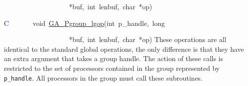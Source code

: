 ~~~~~~~~~~~~~~~~~~~{*}buf,~int~lenbuf,~char~{*}op)

\textcolor{blue}{C}~~~~~~~void~\href{https://hpc.pnl.gov/globalarrays/api/c_op_api.html\#GA_PGROUP_LGOP}{GA\_{}Pgroup\_{}lgop}(int~p\_handle,~long~

~~~~~~~~~~~~~~~~~~~{*}buf,~int~lenbuf,~char~{*}op)
These operations are all identical to the standard global operations,
the only difference is that they have an extra argument that takes
a group handle. The action of these calls is restricted to the set
of processors contained in the group represented by \texttt{p\_handle}.
All processors in the group must call these subroutines.
